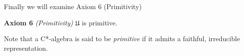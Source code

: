 Finally we will examine Axiom 6 (Primitivity)

\textbf{Axiom 6} \textit{(Primitivity)} $\mathfrak{U}$ is primitive.

Note that a C*-algebra is said to be \textit{primitive} if it admits a faithful, irreducible representation.
